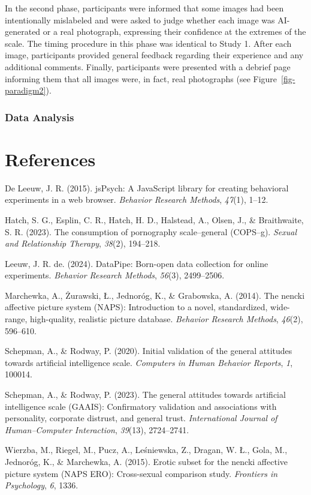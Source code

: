 \documentclass[
  jou,
  floatsintext,
  longtable,
  nolmodern,
  notxfonts,
  notimes,
  colorlinks=true,linkcolor=blue,citecolor=blue,urlcolor=blue]{apa7}
\newlength{\cslhangindent}
\newenvironment{CSLReferences}[2] %
 {\begin{list}{}{%
  \setlength{\itemindent}{0pt}
  \setlength{\leftmargin}{0pt}
  \setlength{\parsep}{0pt}
  \ifodd #1
   \setlength{\leftmargin}{\cslhangindent}
   \setlength{\itemindent}{-1\cslhangindent}
  \fi
  \setlength{\itemsep}{#2\baselineskip}}}
 {\end{list}}
\begin{document}
In the second phase, participants were informed that some images had
been intentionally mislabeled and were asked to judge whether each image
was AI-generated or a real photograph, expressing their confidence at
the extremes of the scale. The timing procedure in this phase was
identical to Study 1. After each image, participants provided general
feedback regarding their experience and any additional comments.
Finally, participants were presented with a debrief page informing them
that all images were, in fact, real photographs (see
Figure~\ref{fig-paradigm2}).

\subsubsection{Data Analysis}\label{data-analysis}

\section{References}\label{references}

\label{refs}
\begin{CSLReferences}{1}{0}
De Leeuw, J. R. (2015). jsPsych: A JavaScript library for creating
behavioral experiments in a web browser. \emph{Behavior Research
Methods}, \emph{47}(1), 1--12.

Hatch, S. G., Esplin, C. R., Hatch, H. D., Halstead, A., Olsen, J., \&
Braithwaite, S. R. (2023). The consumption of pornography scale--general
(COPS--g). \emph{Sexual and Relationship Therapy}, \emph{38}(2),
194--218.

Leeuw, J. R. de. (2024). DataPipe: Born-open data collection for online
experiments. \emph{Behavior Research Methods}, \emph{56}(3), 2499--2506.

Marchewka, A., Żurawski, Ł., Jednoróg, K., \& Grabowska, A. (2014). The
nencki affective picture system (NAPS): Introduction to a novel,
standardized, wide-range, high-quality, realistic picture database.
\emph{Behavior Research Methods}, \emph{46}(2), 596--610.

Schepman, A., \& Rodway, P. (2020). Initial validation of the general
attitudes towards artificial intelligence scale. \emph{Computers in
Human Behavior Reports}, \emph{1}, 100014.

Schepman, A., \& Rodway, P. (2023). The general attitudes towards
artificial intelligence scale (GAAIS): Confirmatory validation and
associations with personality, corporate distrust, and general trust.
\emph{International Journal of Human--Computer Interaction},
\emph{39}(13), 2724--2741.

Wierzba, M., Riegel, M., Pucz, A., Leśniewska, Z., Dragan, W. Ł., Gola,
M., Jednoróg, K., \& Marchewka, A. (2015). Erotic subset for the nencki
affective picture system (NAPS ERO): Cross-sexual comparison study.
\emph{Frontiers in Psychology}, \emph{6}, 1336.

\end{CSLReferences}
\end{document}
